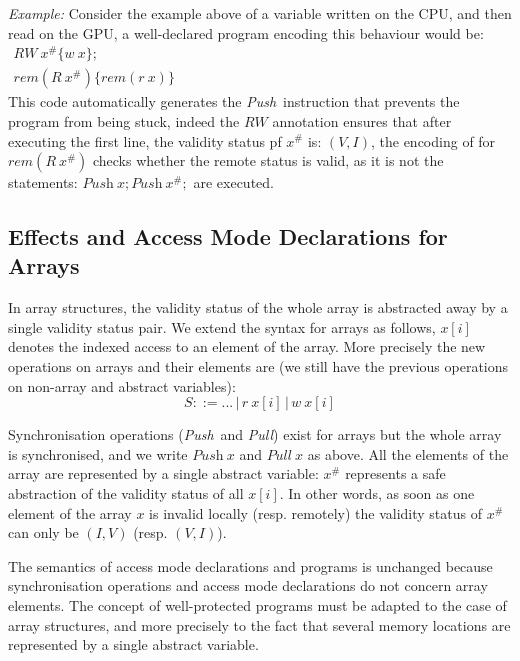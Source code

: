 \documentclass[preprint,12pt]{elsarticle}
\newcommand{\symb}[1]{\textit{#1}}
\newcommand{\Push}{\symb{Push}}
\newcommand{\Pull}{\symb{Pull}}
\newcommand{\rem}[1]{\symb{rem}(#1)}
\newcommand{\abs}[1]{#1^\#}
\newenvironment{example}{\smallskip\par\noindent\emph{Example:}}{\medskip}
\begin{document}
\begin{example}
Consider the example above of a variable written on the CPU, and then read on the GPU, 
a well-declared program encoding this behaviour would be:\\[2mm]
$\begin{array}{l}
RW~\abs x\{w~x\};\\
\rem{R~\abs x}\{\rem{r~x}\}
\end{array}$\\[1mm]
This code automatically generates the \Push\ instruction that prevents 
the program from being stuck, indeed the $RW$ annotation ensures that after executing the first line, the validity status pf $\abs x$ is: $(V,I)$, the encoding of  for $\rem{R~\abs x}$ checks whether the remote status is valid, as it is not the statements: $\Push~x;\Push~\abs x;$ are executed.
\end{example}

\subsection{Effects and Access Mode Declarations for Arrays}\label{sec-arrays}
In array structures, the 
validity status of the whole array is abstracted away by a single validity status pair. 
We extend the syntax for arrays as follows, $x[i]$ denotes the indexed access to an 
element of the array. More precisely the new operations on arrays and their elements are 
(we still have the previous operations on non-array and abstract variables):
\[S::= ... \,|\, r~x[i] \,|\, w~x[i] \]

Synchronisation operations (\Push\ and \Pull) exist for arrays but the whole array is 
synchronised, and we write $\Push~x$ and $\Pull~x$ as above.
All the elements of the array are represented by a single abstract variable: $\abs{x}$ 
represents a safe abstraction of the validity status of all $x[i]$. In other words, as soon as one element of the array $x$ is invalid locally (resp. remotely) the validity status of $\abs x$ can only be $(I,V)$ (resp. $(V,I)$).

The semantics of access mode declarations and programs is unchanged because 
synchronisation operations and access mode declarations do not concern array elements.
The concept of well-protected programs must be adapted to the case of array structures, 
and more 
precisely to the fact that several  memory locations are represented by a single abstract 
variable.
\end{document}

